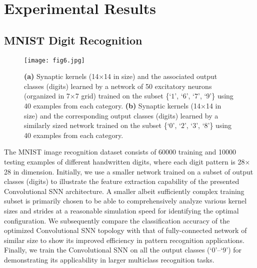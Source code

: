 \documentclass[journal, onecolumn]{IEEEtran}
\begin{document}
\section*{\large\bf{Experimental Results}}
\subsection*{\normalsize\bf{MNIST Digit Recognition}}
\begin{figure}[!t]
\centering
\texttt{[image: fig6.jpg]}
\caption{\textbf{(a)} Synaptic kernels (14$\times$14 in size) and the associated output classes (digits) learned by a network of 50 excitatory neurons (organized in 7$\times$7 grid) trained on the subset \{`$1$', `$6$', `$7$', `$9$'\} using 40 examples from each category. \textbf{(b)} Synaptic kernels (14$\times$14 in size) and the corresponding output classes (digits) learned by a similarly sized network trained on the subset \{`$0$', `$2$', `$3$', `$8$'\} using 40 examples from each category.}
\label{fig:Conv_MNIST_Kernels2}
\end{figure}

The MNIST image recognition dataset \cite{lecun1998mnist} consists of 60000 training and 10000 testing examples of different handwritten digits, where each digit pattern is 28$\times$28 in dimension. Initially, we use a smaller network trained on a subset of output classes (digits) to illustrate the feature extraction capability of the presented Convolutional SNN architecture. A smaller albeit sufficiently complex training subset is primarily chosen to be able to comprehensively analyze various kernel sizes and strides at a reasonable simulation speed for identifying the optimal configuration. We subsequently compare the classification accuracy of the optimized Convolutional SNN topology with that of fully-connected network of similar size to show its improved efficiency in pattern recognition applications. Finally, we train the Convolutional SNN on all the output classes (`$0$'--`$9$') for demonstrating its applicability in larger multiclass recognition tasks.
\end{document}
